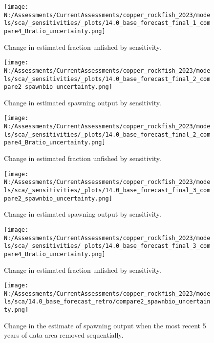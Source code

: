 \documentclass[11pt,
  english,
  letterpaper,
]{article}
\begin{document}
\newpage

\begin{figure}
\centering
\texttt{[image: N:/Assessments/CurrentAssessments/copper\_rockfish\_2023/models/sca/\_sensitivities/\_plots/14.0\_base\_forecast\_final\_1\_compare4\_Bratio\_uncertainty.png]}
\caption{Change in estimated fraction unfished by sensitivity.\label{fig:sens-depl-1}}
\end{figure}

\newpage

\begin{figure}
\centering
\texttt{[image: N:/Assessments/CurrentAssessments/copper\_rockfish\_2023/models/sca/\_sensitivities/\_plots/14.0\_base\_forecast\_final\_2\_compare2\_spawnbio\_uncertainty.png]}
\caption{Change in estimated spawning output by sensitivity.\label{fig:sens-ssb-2}}
\end{figure}

\newpage

\begin{figure}
\centering
\texttt{[image: N:/Assessments/CurrentAssessments/copper\_rockfish\_2023/models/sca/\_sensitivities/\_plots/14.0\_base\_forecast\_final\_2\_compare4\_Bratio\_uncertainty.png]}
\caption{Change in estimated fraction unfished by sensitivity.\label{fig:sens-depl-2}}
\end{figure}

\newpage

\begin{figure}
\centering
\texttt{[image: N:/Assessments/CurrentAssessments/copper\_rockfish\_2023/models/sca/\_sensitivities/\_plots/14.0\_base\_forecast\_final\_3\_compare2\_spawnbio\_uncertainty.png]}
\caption{Change in estimated spawning output by sensitivity.\label{fig:sens-ssb-3}}
\end{figure}

\newpage

\begin{figure}
\centering
\texttt{[image: N:/Assessments/CurrentAssessments/copper\_rockfish\_2023/models/sca/\_sensitivities/\_plots/14.0\_base\_forecast\_final\_3\_compare4\_Bratio\_uncertainty.png]}
\caption{Change in estimated fraction unfished by sensitivity.\label{fig:sens-depl-3}}
\end{figure}

\newpage

\begin{figure}
\centering
\texttt{[image: N:/Assessments/CurrentAssessments/copper\_rockfish\_2023/models/sca/14.0\_base\_forecast\_retro/compare2\_spawnbio\_uncertainty.png]}
\caption{Change in the estimate of spawning output when the most recent 5 years of data area removed sequentially.\label{fig:retro-ssb}}
\end{figure}
\end{document}
